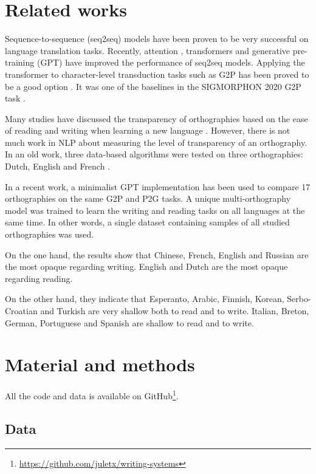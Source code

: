 \documentclass[11pt,a4paper]{article}
\begin{document}
\section{Related works}

Sequence-to-sequence (seq2seq) models have been proven to be very successful on language translation tasks. Recently, attention \cite{bahdanau2016neural}, transformers \cite{vaswani2017attention} and generative pre-training (GPT) \cite{Radford2018ImprovingLU} have improved the performance of seq2seq models. Applying the transformer to character-level transduction tasks such as G2P has been proved to be a good option \cite{wu2021applying}. It was one of the baselines in the SIGMORPHON 2020 G2P task \cite{gorman-etal-2020-sigmorphon}.

Many studies have discussed the transparency of orthographies based on the ease of reading and writing when learning a new language \cite{borleffs2017measuring}. However, there is not much work in NLP about measuring the level of transparency of an orthography. In an old work, three data-based algorithms were tested on three orthographies: Dutch, English and French \cite{bosch-1994-depth}.

In a recent work, a minimalist GPT implementation has been used to compare 17 orthographies \cite{marjou2021oteann} on the same G2P and P2G tasks. A unique multi-orthography model was trained to learn the writing and reading tasks on all languages at the same time. In other words, a single dataset containing samples of all studied orthographies was used.

On the one hand, the results show that Chinese, French, English and Russian are the most opaque regarding writing. English and Dutch are the most opaque regarding reading. 

On the other hand, they indicate that Esperanto, Arabic, Finnish, Korean, Serbo-Croatian and Turkish are very shallow both to read and to write. Italian, Breton, German, Portuguese and Spanish are shallow to read and to write.

\section{Material and methods}

All the code and data is available on GitHub\footnote{\url{https://github.com/juletx/writing-systems}}.

\subsection{Data}
\end{document}
